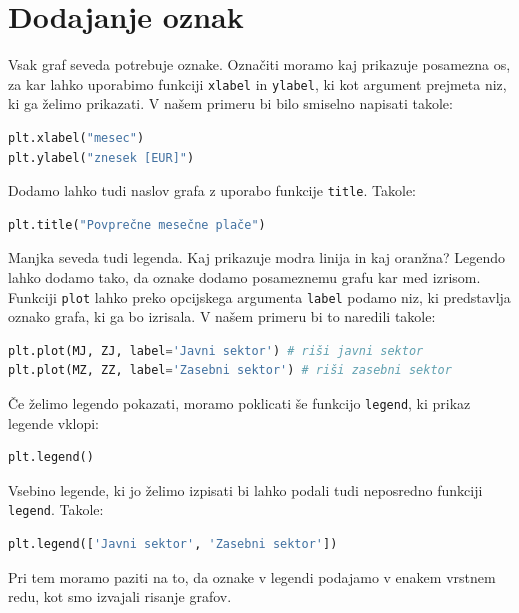 \section{Dodajanje oznak}
Vsak graf seveda potrebuje oznake. Označiti moramo kaj prikazuje posamezna os, za kar lahko uporabimo funkciji \texttt{xlabel} in \texttt{ylabel}, ki kot argument prejmeta niz, ki ga želimo prikazati. V našem primeru bi bilo smiselno napisati takole:
\begin{lstlisting}[language=Python]
plt.xlabel("mesec")
plt.ylabel("znesek [EUR]")
\end{lstlisting}
Dodamo lahko tudi naslov grafa z uporabo funkcije \texttt{title}. Takole:
\begin{lstlisting}[language=Python]
plt.title("Povprečne mesečne plače")
\end{lstlisting}

Manjka seveda tudi legenda. Kaj prikazuje modra linija in kaj oranžna? Legendo lahko dodamo tako, da oznake dodamo posameznemu grafu kar med izrisom. Funkciji \texttt{plot} lahko preko opcijskega argumenta \texttt{label} podamo niz, ki predstavlja oznako grafa, ki ga bo izrisala. V našem primeru bi to naredili takole:
\begin{lstlisting}[language=Python]
plt.plot(MJ, ZJ, label='Javni sektor') # riši javni sektor
plt.plot(MZ, ZZ, label='Zasebni sektor') # riši zasebni sektor
\end{lstlisting}
Če želimo legendo pokazati, moramo poklicati še funkcijo \texttt{legend}, ki prikaz legende vklopi:
\begin{lstlisting}[language=Python]
plt.legend()
\end{lstlisting}
Vsebino legende, ki jo želimo izpisati bi lahko podali tudi neposredno funkciji \texttt{legend}. Takole:
\begin{lstlisting}[language=Python]
plt.legend(['Javni sektor', 'Zasebni sektor'])
\end{lstlisting}
Pri tem moramo paziti na to, da oznake v legendi podajamo v enakem vrstnem redu, kot smo izvajali risanje grafov.


